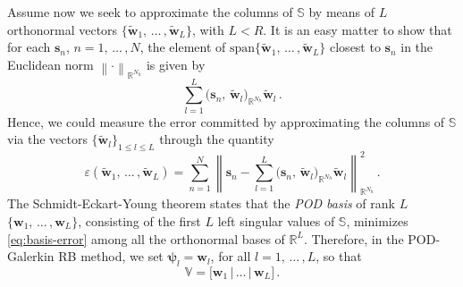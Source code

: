 \documentclass{elsarticle}
\numberwithin{equation}{section}
\theoremstyle{theorem}
\theoremstyle{definition}
\theoremstyle{remark}
\theoremstyle{proposition}
\numberwithin{figure}{section}
\newcommand{\norm}[1]{\left\lVert#1\right\rVert}
\newcommand{\wt}[1]{\widetilde{#1}}
\newcommand{\bg}[1]{\boldsymbol{#1}}
\begin{document}
		\noindent Assume now we seek to approximate the columns of $\mathbb{S}$ by means of $L$ orthonormal vectors $\big\lbrace \wt{\mathbf{w}}_1, \, \ldots \, , \wt{\mathbf{w}}_L \big\rbrace$, with $L < R$. It is an easy matter to show that for each $\mathbf{s}_n$, $n = 1, \, \ldots \, , N$, the element of $\text{span} \big\lbrace \wt{\mathbf{w}}_1, \, \ldots \, , \wt{\mathbf{w}}_L \big\rbrace$ closest to $\mathbf{s}_n$ in the Euclidean norm $\norm{\cdot}_{\mathbb{R}^{N_h}}$ is given by
		\begin{equation*}
			\sum_{l = 1}^L \big( \mathbf{s}_n, \, \wt{\mathbf{w}}_l \big)_{\mathbb{R}^{N_h}} \wt{\mathbf{w}}_l \, .
		\end{equation*} 
		Hence, we could measure the error committed by approximating the columns of $\mathbb{S}$ via the vectors $\big\lbrace \wt{\mathbf{w}}_l \big\rbrace_{1 \leq l \leq L}$ through the quantity
		\begin{equation}
			\label{eq:basis-error}
			\varepsilon(\wt{\mathbf{w}}_1, \, \ldots \, , \wt{\mathbf{w}}_L) = \sum_{n = 1}^N \norm{\mathbf{s}_n - \sum_{l = 1}^L \big( \mathbf{s}_n, \, \wt{\mathbf{w}}_l \big)_{\mathbb{R}^{N_h}} \wt{\mathbf{w}}_l}_{\mathbb{R}^{N_h}}^2 \, .
		\end{equation}
		The Schmidt-Eckart-Young theorem \cite{EY36, Sch07} states that the \emph{POD basis} of rank $L$ $\big\lbrace \mathbf{w}_1, \, \ldots \, , \mathbf{w}_L \big\rbrace$, consisting of the first $L$ left singular values of $\mathbb{S}$, minimizes \eqref{eq:basis-error} among all the orthonormal bases of $\mathbb{R}^L$. Therefore, in the POD-Galerkin RB method, we set $\bg{\psi}_l = \mathbf{w}_l$, for all $l = 1, \, \ldots \, , L$, so that
		\begin{equation*}
			\mathbb{V} = \big[ \mathbf{w}_1 \, \big| \, \ldots \, \big| \, \mathbf{w}_L \big] \, . %
		\end{equation*}
	
\end{document}
